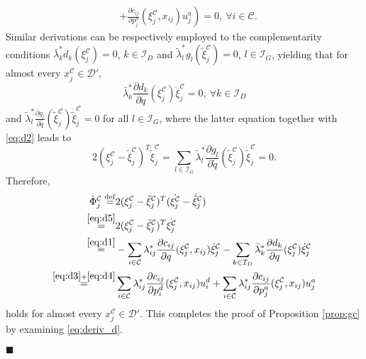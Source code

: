 \documentclass[journal]{IEEEtran}
\newenvironment{Proof}{\noindent{\em Proof:\/}}{\hfill $\blacksquare$\par}
\newcommand{\D}{\mathcal{D}}
\newcommand{\I}{\mathcal{I}}
\newcommand{\C}{\mathcal{C}}
\newcommand{\1}{\mathbf{1}}
\begin{document}
\begin{Proof}
\begin{equation}
\begin{split}
		&\left.+\frac{\partial c_{ij}}{\partial p^a_j}(\xi^\C_j,x_{ij})u^a_j\right)=0,~ \forall i\in \C.
	\end{split}
\end{equation}
Similar derivations can be respectively employed to the complementarity conditions $\bar{\lambda}_k^*d_k(\xi^\C_j)=0$, $k\in \I_D$ and $\tilde{\lambda}_l^*g_l(\tilde{\xi}^\C_j)=0$, $l\in\I_G$, yielding that for almost every $x^\C_j\in \D'$,
\begin{equation}\label{eq:d4}
	\bar{\lambda}_k^*\frac{\partial d_k}{\partial q}(\xi^\C_j)\dot{\xi}^\C_j=0,~\forall k\in \I_D
\end{equation}
and $\tilde{\lambda}_l^*\frac{\partial g_l}{\partial \tilde{q}} (\tilde{\xi}^\C_j)\dot{\tilde{\xi}}^\C_j=0$ for all $l\in \I_G$, where the latter equation together with \eqref{eq:d2} leads to
\begin{equation}\label{eq:d5}
	2(\xi^\C_j-\tilde{\xi}^\C_j)^T\dot{\tilde{\xi}}^\C_j=\sum_{l\in\I_G}\tilde{\lambda}_l^*\frac{\partial g_l}{\partial \tilde{q}}(\tilde{\xi}^\C_j)\dot{\tilde{\xi}}^\C_j=0.
\end{equation}
Therefore, 
\begin{equation*}
	\begin{split}
		\dot{\Phi}^\C_j\overset{\mathrm{def}}{=}&2(\xi^\C_j-\tilde{\xi}^\C_j)^T(\dot{\xi^\C_j}-\dot{\tilde{\xi}}^\C_j)\\
		\overset{\eqref{eq:d5}}{=}&2(\xi^\C_j-\tilde{\xi}^\C_j)^T\dot{\xi^\C_j}\\
		\overset{\eqref{eq:d1}}{=}&-\sum_{i\in \C}\lambda_{ij}^*\frac{\partial c_{ij}}{\partial q}(\xi^\C_j,x_{ij})\dot{\xi}^\C_j-\sum_{k\in\I_D}\bar{\lambda}_k^*\frac{\partial d_k}{\partial q}(\xi^\C_j)\dot{\xi}^\C_j\\
		\overset{\eqref{eq:d3}+\eqref{eq:d4}}{=}&\sum_{i\in \C}\lambda_{ij}^*\frac{\partial c_{ij}}{\partial p^d_i}(\xi^\C_j,x_{ij})u^d_i+\sum_{i\in \C}\lambda_{ij}^*\frac{\partial c_{ij}}{\partial p^a_j}(\xi^\C_j,x_{ij})u^a_j
	\end{split}
\end{equation*}
holds for almost every $x^\C_j\in \D'$. This completes the proof of Proposition \ref{prop:gc} by examining \eqref{eq:deriv_d}.


\end{Proof}
\end{document}

